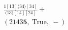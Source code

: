 \documentclass[varwidth, border=5pt]{standalone}
\begin{document}
\begin{my}
$\begin{gathered}
\scriptscriptstyle\frac{1[13]⟨34⟩[34]}{⟨13⟩[14][24]} +\\
\scriptscriptstyle(2143𝟓,\;\text{True},\;-) \phantom{+}
\end{gathered}$
\end{my}
\end{document}
